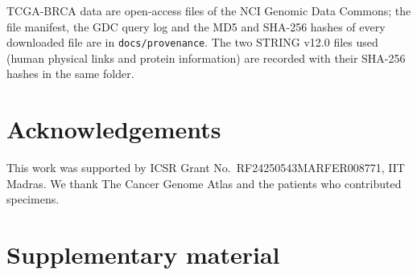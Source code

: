 \documentclass[11pt,a4paper]{article}
\begin{document}
TCGA-BRCA data are open-access files of the NCI Genomic Data Commons; the file manifest, the GDC query log and the MD5 and SHA-256 hashes of every downloaded file are in \texttt{docs/provenance}. The two STRING v12.0 files used (human physical links and protein information) are recorded with their SHA-256 hashes in the same folder.

\begin{table}[H]
\centering\footnotesize
\caption{Simulation result files used in this paper (repository \coderepo, commit \resultscommit). Hashes are of the files with LF line endings, the form stored in Git; the first 16 hexadecimal characters are shown, and the full hashes of these and of the TCGA result files are in \texttt{docs/provenance/results\_sha256.csv}.}
\label{tab:provenance}

\end{table}

\section*{Acknowledgements}
This work was supported by ICSR Grant No.\ RF24250543MARFER008771, IIT Madras. We thank The Cancer Genome Atlas and the patients who contributed specimens.




\clearpage
\appendix
\renewcommand{\thesection}{S\arabic{section}}
\section*{Supplementary material}

\end{document}

